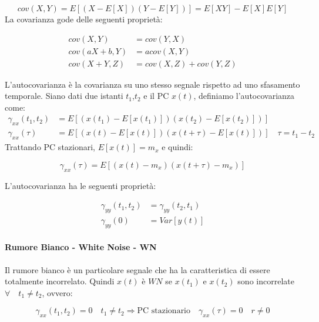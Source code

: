   \[ cov(X,Y)=E\left[(X-E[X])(Y-E[Y])\right]=E[XY]-E[X]E[Y] \]
La covarianza gode delle seguenti proprietà:

  \begin{align*}
    cov(X,Y)&=cov(Y,X)\\
    cov(aX+b,Y)&=acov(X,Y)\\
    cov(X+Y,Z)&=cov(X,Z)+cov(Y,Z)
  \end{align*}

L'autocovarianza è la covarianza su uno stesso segnale rispetto ad uno sfasamento temporale. Siano dati due istanti $t_1$,$t_2$ e il PC $x(t)$, definiamo l'autocovarianza come:
  \begin{align*}
    \gamma_{xx}(t_1,t_2)&=E\left[(x(t_1)-E[x(t_1)])(x(t_2)-E[x(t_2)])\right]\\
       \gamma_{xx}(\tau)&=E[(x(t)-E[x(t)])(x(t+\tau)-E[x(t)])] \quad \tau=t_1-t_2
  \end{align*}
Trattando PC stazionari, $E[x(t)]=m_x$ e quindi:

  \[ \gamma_{xx}(\tau)=E[(x(t)-m_x)(x(t+\tau)-m_x)] \]

\noindent L'autocovarianza ha le seguenti proprietà:

  \begin{align*}
    \gamma_{yy}(t_1,t_2)&=\gamma_{yy}(t_2,t_1)\\
          \gamma_{yy}(0)&=Var[y(t)]
  \end{align*}
        
\paragraph{Rumore Bianco - White Noise - WN}
Il rumore bianco è un particolare segnale che ha la caratteristica di essere totalmente incorrelato. Quindi $x(t)$ è $WN$ se $x(t_1)$ e $x(t_2)$ sono incorrelate $\forall \quad t_1\neq t_2$, ovvero: 

\[ \gamma_{xx}(t_1,t_2)=0 \quad t_1 \neq t_2 \Longrightarrow \text{PC stazionario}\quad \gamma_{xx}(\tau)=0 \quad r\neq 0 \]

